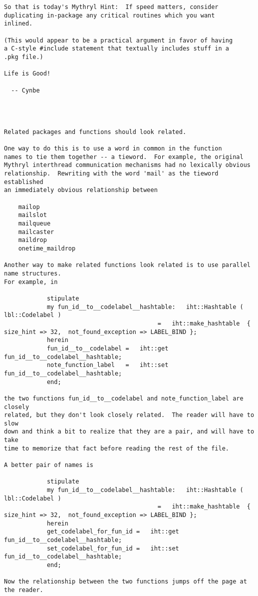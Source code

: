 \begin{verbatim}
So that is today's Mythryl Hint:  If speed matters, consider
duplicating in-package any critical routines which you want
inlined.

(This would appear to be a practical argument in favor of having
a C-style #include statement that textually includes stuff in a
.pkg file.)

Life is Good!

  -- Cynbe




Related packages and functions should look related.

One way to do this is to use a word in common in the function
names to tie them together -- a tieword.  For example, the original
Mythryl interthread communication mechanisms had no lexically obvious
relationship.  Rewriting with the word 'mail' as the tieword established
an immediately obvious relationship between

    mailop
    mailslot
    mailqueue
    mailcaster
    maildrop
    onetime_maildrop

Another way to make related functions look related is to use parallel name structures.
For example, in

		    stipulate
			my fun_id__to__codelabel__hashtable:   iht::Hashtable ( lbl::Codelabel )
				                           =   iht::make_hashtable  { size_hint => 32,  not_found_exception => LABEL_BIND };
		    herein
			fun_id__to__codelabel =   iht::get   fun_id__to__codelabel__hashtable;
			note_function_label   =   iht::set   fun_id__to__codelabel__hashtable;
		    end;

the two functions fun_id__to__codelabel and note_function_label are closely
related, but they don't look closely related.  The reader will have to slow
down and think a bit to realize that they are a pair, and will have to take
time to memorize that fact before reading the rest of the file.

A better pair of names is

		    stipulate
			my fun_id__to__codelabel__hashtable:   iht::Hashtable ( lbl::Codelabel )
				                           =   iht::make_hashtable  { size_hint => 32,  not_found_exception => LABEL_BIND };
		    herein
			get_codelabel_for_fun_id =   iht::get   fun_id__to__codelabel__hashtable;
			set_codelabel_for_fun_id =   iht::set   fun_id__to__codelabel__hashtable;
		    end;

Now the relationship between the two functions jumps off the page at the reader.




\end{verbatim}
